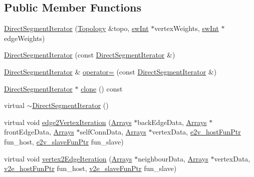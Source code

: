 \subsection*{Public Member Functions}
\begin{DoxyCompactItemize}
\item 
\mbox{\hyperlink{classUNAT_1_1DirectSegmentIterator_acf8859148e589468d895eccec1f693a4}{Direct\+Segment\+Iterator}} (\mbox{\hyperlink{classUNAT_1_1Topology}{Topology}} \&topo, \mbox{\hyperlink{include_2swMacro_8h_a113cf5f6b5377cdf3fac6aa4e443e9aa}{sw\+Int}} $\ast$vertex\+Weights, \mbox{\hyperlink{include_2swMacro_8h_a113cf5f6b5377cdf3fac6aa4e443e9aa}{sw\+Int}} $\ast$edge\+Weights)
\item 
\mbox{\hyperlink{classUNAT_1_1DirectSegmentIterator_a7fc34e551631ed24ca7d877371352c2a}{Direct\+Segment\+Iterator}} (const \mbox{\hyperlink{classUNAT_1_1DirectSegmentIterator}{Direct\+Segment\+Iterator}} \&)
\item 
\mbox{\hyperlink{classUNAT_1_1DirectSegmentIterator}{Direct\+Segment\+Iterator}} \& \mbox{\hyperlink{classUNAT_1_1DirectSegmentIterator_a19a1d4233e99debf72abde549fff9551}{operator=}} (const \mbox{\hyperlink{classUNAT_1_1DirectSegmentIterator}{Direct\+Segment\+Iterator}} \&)
\item 
\mbox{\hyperlink{classUNAT_1_1DirectSegmentIterator}{Direct\+Segment\+Iterator}} $\ast$ \mbox{\hyperlink{classUNAT_1_1DirectSegmentIterator_a998b5eef5895e387e54811ef3f5ffd84}{clone}} () const
\item 
virtual \mbox{\hyperlink{classUNAT_1_1DirectSegmentIterator_a5d0082eae58d460478e7564727fc72f3}{$\sim$\+Direct\+Segment\+Iterator}} ()
\item 
virtual void \mbox{\hyperlink{classUNAT_1_1DirectSegmentIterator_a4b4de063d998f54f092a3ca779fd818f}{edge2\+Vertex\+Iteration}} (\mbox{\hyperlink{structArrays}{Arrays}} $\ast$back\+Edge\+Data, \mbox{\hyperlink{structArrays}{Arrays}} $\ast$front\+Edge\+Data, \mbox{\hyperlink{structArrays}{Arrays}} $\ast$self\+Conn\+Data, \mbox{\hyperlink{structArrays}{Arrays}} $\ast$vertex\+Data, \mbox{\hyperlink{test_2directSegment_2iterator_8h_ae588e578b6781906a44208130df0ab29}{e2v\+\_\+host\+Fun\+Ptr}} fun\+\_\+host, \mbox{\hyperlink{test_2directSegment_2iterator_8h_a7b58029f74760f3ca5384034c0e89c15}{e2v\+\_\+slave\+Fun\+Ptr}} fun\+\_\+slave)
\item 
virtual void \mbox{\hyperlink{classUNAT_1_1DirectSegmentIterator_a6f53d346ec280ecfc3acf82691f6eaea}{vertex2\+Edge\+Iteration}} (\mbox{\hyperlink{structArrays}{Arrays}} $\ast$neighbour\+Data, \mbox{\hyperlink{structArrays}{Arrays}} $\ast$vertex\+Data, \mbox{\hyperlink{test_2directSegment_2iterator_8h_a15a4eedea7b94460153f0a0924c98224}{v2e\+\_\+host\+Fun\+Ptr}} fun\+\_\+host, \mbox{\hyperlink{test_2directSegment_2iterator_8h_acd8809485e3b16adfce1d459f3372671}{v2e\+\_\+slave\+Fun\+Ptr}} fun\+\_\+slave)

\end{DoxyCompactItemize}
